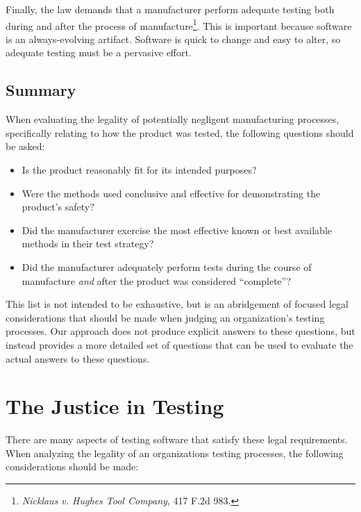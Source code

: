 Finally, the law demands that a manufacturer perform adequate testing both
during and after the process of manufacture\footnote{\textit{Nicklaus v. Hughes
Tool Company}, 417 F.2d 983.}. This is important because software is an
always-evolving artifact. Software is quick to change and easy to alter, so
adequate testing must be a pervasive effort.

\subsection{Summary}
When evaluating the legality of potentially negligent manufacturing processes,
specifically relating to how the product was tested, the following questions
should be asked:

\singlespace
\begin{itemize}
  \item Is the product reasonably fit for its intended purposes?
  \item Were the methods used conclusive and effective for demonstrating the
  product's safety?
  \item Did the manufacturer exercise the most effective known or best available
  methods in their test strategy?
  \item Did the manufacturer adequately perform tests during the course of
  manufacture \textit{and} after the product was considered ``complete''?
\end{itemize}
\doublespace

This list is not intended to be exhaustive, but is an abridgement of focused
legal considerations that should be made when judging an organization's testing
processes. Our approach does not produce explicit answers to these questions,
but instead provides a more detailed set of questions that can be used to
evaluate the actual answers to these questions.

\section{The Justice in Testing}

There are many aspects of testing software that satisfy these legal
requirements. When analyzing the legality of an organizations testing processes,
the following considerations should be made:

